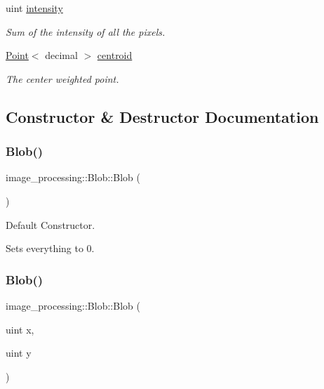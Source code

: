 \begin{DoxyCompactItemize}
uint \hyperlink{classimage__processing_1_1Blob_a9d69612e5931c12bbbfa25e44b626f5f}{intensity}
\begin{DoxyCompactList}\small\item\em Sum of the intensity of all the pixels. \end{DoxyCompactList}\item 
\mbox{\label{classimage__processing_1_1Blob_a99da260a75ef943f09711bfefa37ab4e}} 
\hyperlink{classutil_1_1Point}{Point}$<$ decimal $>$ \hyperlink{classimage__processing_1_1Blob_a99da260a75ef943f09711bfefa37ab4e}{centroid}
\begin{DoxyCompactList}\small\item\em The center weighted point. \end{DoxyCompactList}\end{DoxyCompactItemize}


\subsection{Constructor \& Destructor Documentation}
\mbox{\label{classimage__processing_1_1Blob_a28446a1a7d8e24aa3f17c1fd4030a216}} 
\subsubsection{\texorpdfstring{Blob()}{Blob()}\hspace{0.1cm}{\footnotesize\ttfamily [1/2]}}
{\footnotesize\ttfamily image\+\_\+processing\+::\+Blob\+::\+Blob (\begin{DoxyParamCaption}{ }\end{DoxyParamCaption})}



Default Constructor. 

Sets everything to 0. \mbox{\label{classimage__processing_1_1Blob_aa1388b1af488ef5151e33db83ba0f395}} 
\subsubsection{\texorpdfstring{Blob()}{Blob()}\hspace{0.1cm}{\footnotesize\ttfamily [2/2]}}
{\footnotesize\ttfamily image\+\_\+processing\+::\+Blob\+::\+Blob (\begin{DoxyParamCaption}\item[{uint}]{x,  }\item[{uint}]{y }\end{DoxyParamCaption})}



